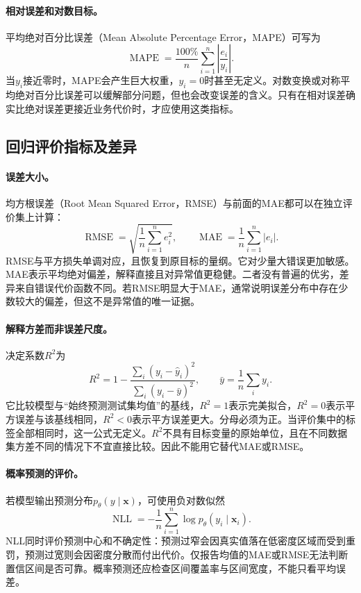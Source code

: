 \paragraph{相对误差和对数目标。}
平均绝对百分比误差（Mean Absolute Percentage Error，MAPE）可写为
\begin{equation}
 \operatorname{MAPE}=\frac{100\%}{n}\sum_{i=1}^n\left|\frac{e_i}{y_i}\right|.
 \label{eq:regression-mape}
\end{equation}
当$y_i$接近零时，MAPE会产生巨大权重，$y_i=0$时甚至无定义。对数变换或对称平均绝对百分比误差可以缓解部分问题，但也会改变误差的含义。只有在相对误差确实比绝对误差更接近业务代价时，才应使用这类指标。

\subsection{回归评价指标及差异}
\paragraph{误差大小。}
均方根误差（Root Mean Squared Error，RMSE）与前面的MAE都可以在独立评价集上计算：
\begin{equation}
 \operatorname{RMSE}=\sqrt{\frac1n\sum_{i=1}^ne_i^2},
 \qquad
 \operatorname{MAE}=\frac1n\sum_{i=1}^n|e_i|.
 \label{eq:regression-rmse-mae}
\end{equation}
RMSE与平方损失单调对应，且恢复到原目标的量纲。它对少量大错误更加敏感。MAE表示平均绝对偏差，解释直接且对异常值更稳健。二者没有普遍的优劣，差异来自错误代价函数不同。若RMSE明显大于MAE，通常说明误差分布中存在少数较大的偏差，但这不是异常值的唯一证据。

\paragraph{解释方差而非误差尺度。}
决定系数$R^2$为
\begin{equation}
 R^2=1-\frac{\sum_i(y_i-\hat y_i)^2}{\sum_i(y_i-\bar y)^2},
 \qquad \bar y=\frac1n\sum_i y_i.
 \label{eq:regression-r2}
\end{equation}
它比较模型与“始终预测测试集均值”的基线，$R^2=1$表示完美拟合，$R^2=0$表示平方误差与该基线相同，$R^2<0$表示平方误差更大。分母必须为正。当评价集中的标签全部相同时，这一公式无定义。$R^2$不具有目标变量的原始单位，且在不同数据集方差不同的情况下不宜直接比较。因此不能用它替代MAE或RMSE。

\paragraph{概率预测的评价。}
若模型输出预测分布$p_\theta(y\mid\bm x)$，可使用负对数似然
\begin{equation}
 \operatorname{NLL}=-\frac1n\sum_{i=1}^n\log p_\theta(y_i\mid\bm x_i).
 \label{eq:regression-nll}
\end{equation}
NLL同时评价预测中心和不确定性：预测过窄会因真实值落在低密度区域而受到重罚，预测过宽则会因密度分散而付出代价。仅报告均值的MAE或RMSE无法判断置信区间是否可靠。概率预测还应检查区间覆盖率与区间宽度，不能只看平均误差。

